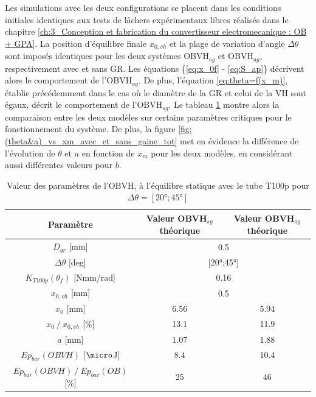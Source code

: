 Les simulations avec les deux configurations se placent dans les conditions initiales identiques aux tests de lâchers expérimentaux libres réalisés dans le chapitre \ref{ch:3_Conception et fabrication du convertisseur electromecanique : OB + GPA}. La position d'équilibre finale $x_{0,vh}$ et la plage de variation d'angle $\Delta\theta$ sont imposés identiques pour les deux systèmes OBVH$_{sg}$ et OBVH$_{ag}$, respectivement avec et sans GR. Les équations \{\ref{eq:x_0f} -  \ref{eq:S_ap}\} décrivent alors le comportement de l'OBVH$_{ag}$. De plus, l'équation \ref{eq:theta=f(x_m)}, établie précédemment dans le cas où le diamètre de la GR et celui de la VH sont égaux, décrit le comportement de l'OBVH$_{sg}$. Le tableau \ref{tab:comparaison_AG-SG} montre alors la comparaison entre les deux modèles sur certains paramètres critiques pour le fonctionnement du système. De plus, la figure \ref{fig:(theta&a)_vs_xm_avec_et_sans_gaine_tot} met en évidence la différence de l'évolution de $\theta$ et $a$ en fonction de $x_m$ pour les deux modèles, en considérant aussi différentes valeurs pour $b$.
\begin{table}[!htbp]
	\centering
		\begin{tabular}[t]{|c||c|c|}
\hline
\textbf{Paramètre} & \textbf{Valeur OBVH$_{sg}$ théorique} & \textbf{Valeur OBVH$_{ag}$ théorique} \\
\hline \hline
$D_{gr}$ [mm] 						& \multicolumn{2}{|c|}{0.5}  \\ \hline
$\Delta\theta$ [deg] 			& \multicolumn{2}{|c|}{[\ang{20};\ang{45}]} \\
\hline
$K_{T100p}(\theta_f)$ [Nmm/rad] & \multicolumn{2}{|c|}{0.16} \\ \hline
$x_{0,vh}$ [mm] 				& \multicolumn{2}{|c|}{0.5}  \\ \hline
$x_{0}$  [mm]  					& 6.56 		&	5.94		 \\ \hline
$x_{0}\ /\ x_{0,vh}$ [\%] 		& 13.1		&	11.9		 \\ \hline
$a$		   [mm]         		& 1.07 		&	1.88 		 \\ \hline
$Ep_{bar}(OBVH)$ [$\micro$J]    & 8.4 		& 	10.4		 \\ \hline
$Ep_{bar}(OBVH)\ /\ Ep_{bar}(OB)$ [\%]  & 25    &    46		     \\ \hline
		\end{tabular}
        \caption{Valeur des paramètres de l'OBVH, à l'équilibre statique avec le tube T100p pour $\Delta\theta=[\ang{20};\ang{45}]$}
        \label{tab:comparaison_AG-SG}
\end{table}        

